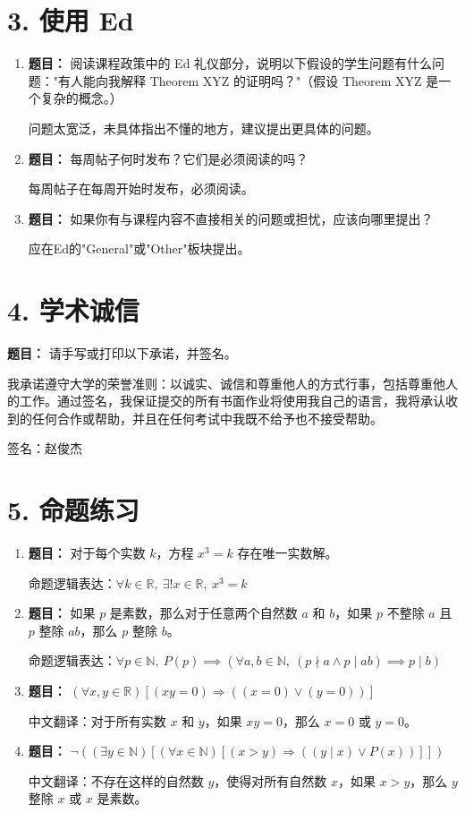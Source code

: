 \documentclass[11pt]{article}
\newenvironment{qparts}{\begin{enumerate}[{(}a{)}]}{\end{enumerate}}
\begin{document}
\section*{3. 使用 Ed}
\begin{qparts}
\item \textbf{题目：} 阅读课程政策中的 Ed 礼仪部分，说明以下假设的学生问题有什么问题："有人能向我解释 Theorem XYZ 的证明吗？"（假设 Theorem XYZ 是一个复杂的概念。）

问题太宽泛，未具体指出不懂的地方，建议提出更具体的问题。

\item \textbf{题目：} 每周帖子何时发布？它们是必须阅读的吗？

每周帖子在每周开始时发布，必须阅读。

\item \textbf{题目：} 如果你有与课程内容不直接相关的问题或担忧，应该向哪里提出？

应在Ed的"General"或"Other"板块提出。
\end{qparts}

\newpage
\section*{4. 学术诚信}
\textbf{题目：} 请手写或打印以下承诺，并签名。

我承诺遵守大学的荣誉准则：以诚实、诚信和尊重他人的方式行事，包括尊重他人的工作。通过签名，我保证提交的所有书面作业将使用我自己的语言，我将承认收到的任何合作或帮助，并且在任何考试中我既不给予也不接受帮助。

签名：赵俊杰

\newpage
\section*{5. 命题练习}
\begin{qparts}
\item \textbf{题目：} 对于每个实数 $k$，方程 $x^3 = k$ 存在唯一实数解。

命题逻辑表达：$\forall k \in \mathbb{R},\ \exists! x \in \mathbb{R},\ x^3 = k$

\item \textbf{题目：} 如果 $p$ 是素数，那么对于任意两个自然数 $a$ 和 $b$，如果 $p$ 不整除 $a$ 且 $p$ 整除 $a b$，那么 $p$ 整除 $b$。

命题逻辑表达：$\forall p \in \mathbb{N},\ P(p) \implies (\forall a, b \in \mathbb{N},\ (p \nmid a \wedge p \mid ab) \implies p \mid b)$

\item \textbf{题目：} $(\forall x, y \in \mathbb{R})[(x y = 0) \Longrightarrow ((x = 0) \vee (y = 0))]$

中文翻译：对于所有实数 $x$ 和 $y$，如果 $x y = 0$，那么 $x = 0$ 或 $y = 0$。

\item \textbf{题目：} $\neg ((\exists y \in \mathbb{N})[(\forall x \in \mathbb{N})[(x > y) \Longrightarrow ((y \mid x) \vee P(x))]])$

中文翻译：不存在这样的自然数 $y$，使得对所有自然数 $x$，如果 $x > y$，那么 $y$ 整除 $x$ 或 $x$ 是素数。
\end{qparts}
\end{document}

